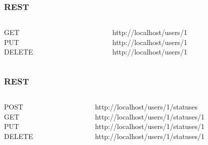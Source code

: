 
\begin{frame}
  \frametitle{REST}
  \begin{columns}
    \begin{column}{.3\textwidth}
      \begin{flushright}
      GET\\
      PUT\\
      DELETE
      \end{flushright}
    \end{column}    
    \begin{column}{.7\textwidth}
      \begin{flushleft}
      http://localhost/users/1\\
      http://localhost/users/1\\
      http://localhost/users/1\\
      \end{flushleft}
    \end{column}    
    \end{columns}
\end{frame}


\begin{frame}
  \frametitle{REST}
  \begin{columns}
    \begin{column}{.3\textwidth}
      \begin{flushright}
      POST\\
      GET\\
      PUT\\
      DELETE
      \end{flushright}
    \end{column}    
    \begin{column}{.7\textwidth}
      \begin{flushleft}
      http://localhost/users/1/statuses\\
      http://localhost/users/1/statuses/1\\
      http://localhost/users/1/statuses/1\\
      http://localhost/users/1/statuses/1\\
      \end{flushleft}
    \end{column}    
  \end{columns}
\end{frame}

